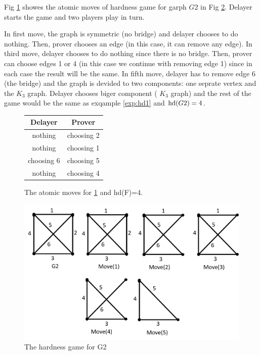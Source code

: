 \documentclass[12pt]{book}
\begin{document}
\begin{examp}\label{exp:hd2}
       Fig \ref{fig:game2} showes the atomic moves of hardness game for garph $G2$ in Fig \ref{fig:hd2}. Delayer starts the game and two 
	   players play in turn. 
	   
	   In first move, the graph is symmetric (no bridge) and delayer chooses to do nothing. Then, prover chooses an edge (in this case, it can remove any edge). 
	   In third move, delayer chooses to do nothing since there is no bridge. Then, prover can choose edges 1 or 4 (in this case we continue with removing edge 1) since in each case 
	   the result will be the same. In fifth move, delayer has to remove edge 6 (the bridge) and the graph is devided to two components: 
	   one seprate vertex and the $K_3$ graph. Delayer chooses biger component ( $K_3$ graph) and the rest of the game would be the same as exqample \ref{exp:hd1} and $\operatorname{hd}(G2)=4$.
	 
	 \begin{figure}[h]
      \centering
      \begin{tabular}{|c|c|} 
      \hline
                  Delayer & Prover \\ \hline
                  nothing & choosing 2  \\ \hline
                  nothing & choosing 1  \\ \hline
                  choosing 6 & choosing 5  \\ \hline
                  nothing & choosing 4 \\ \hline
      \end{tabular}
      \caption{The atomic moves for \ref{fig:game2} and hd(F)=4.}
      \label{fig:game2}
      \end{figure}
	  \begin{figure}
      \begin{center}
      \includegraphics[scale =0.6]{g2.png}
      \caption{The hardness game for G2}
	  \label{fig:hd2}
      \end{center}
      \end{figure}
	   
\end{examp}
\end{document}
